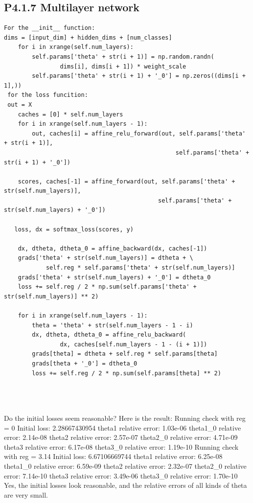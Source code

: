\documentclass[12pt]{article}
\begin{document}
\subsection*{P4.1.7 Multilayer network }
\begin{lstlisting}
For the __init__ function:
dims = [input_dim] + hidden_dims + [num_classes]
    for i in xrange(self.num_layers):
        self.params['theta' + str(i + 1)] = np.random.randn(
                dims[i], dims[i + 1]) * weight_scale
        self.params['theta' + str(i + 1) + '_0'] = np.zeros((dims[i + 1],))
 for the loss funcition:
 out = X
    caches = [0] * self.num_layers
    for i in xrange(self.num_layers - 1):
        out, caches[i] = affine_relu_forward(out, self.params['theta' + str(i + 1)],
                                                 self.params['theta' + str(i + 1) + '_0'])

    scores, caches[-1] = affine_forward(out, self.params['theta' + str(self.num_layers)],
                                            self.params['theta' + str(self.num_layers) + '_0'])
        
   loss, dx = softmax_loss(scores, y)

    dx, dtheta, dtheta_0 = affine_backward(dx, caches[-1])
    grads['theta' + str(self.num_layers)] = dtheta + \
            self.reg * self.params['theta' + str(self.num_layers)]
    grads['theta' + str(self.num_layers) + '_0'] = dtheta_0
    loss += self.reg / 2 * np.sum(self.params['theta' + str(self.num_layers)] ** 2)

    for i in xrange(self.num_layers - 1):
        theta = 'theta' + str(self.num_layers - 1 - i)
        dx, dtheta, dtheta_0 = affine_relu_backward(
                dx, caches[self.num_layers - 1 - (i + 1)])
        grads[theta] = dtheta + self.reg * self.params[theta]
        grads[theta + '_0'] = dtheta_0
        loss += self.reg / 2 * np.sum(self.params[theta] ** 2)

   
    
\end{lstlisting}

Do the initial losses seem reasonable?
Here is the result:
Running check with reg =  0
Initial loss:  2.28667430954
theta1 relative error: 1.03e-06
theta1\_0 relative error: 2.14e-08
theta2 relative error: 2.57e-07
theta2\_0 relative error: 4.71e-09
theta3 relative error: 6.17e-08
theta3\_0 relative error: 1.19e-10
Running check with reg =  3.14
Initial loss:  6.67106669744
theta1 relative error: 6.25e-08
theta1\_0 relative error: 6.59e-09
theta2 relative error: 2.32e-07
theta2\_0 relative error: 7.14e-10
theta3 relative error: 3.49e-06
theta3\_0 relative error: 1.70e-10
Yes, the initial losses look reasonable, and the relative errors of all kinds of theta are very small.
\end{document}
